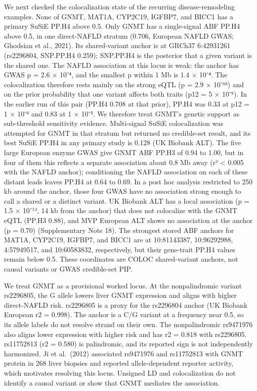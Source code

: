 We next checked the colocalization state of the recurring disease-remodeling examples. None of GNMT, MAT1A, CYP2C19, IGFBP7, and BICC1 has a primary SuSiE PP.H4 above 0.5. Only GNMT has a single-signal ABF PP.H4 above 0.5, in one direct-NAFLD stratum (0.706, European NAFLD GWAS; Ghodsian et al., 2021). Its shared-variant anchor is at GRCh37 6:42931261 (rs2296804, SNP.PP.H4 0.259); SNP.PP.H4 is the posterior that a given variant is the shared one. The NAFLD association at this locus is weak: the anchor has GWAS p = 2.6 × 10⁻⁴, and the smallest p within 1 Mb is 1.4 × 10⁻⁴. The colocalization therefore rests mainly on the strong eQTL (p = 2.9 × 10⁻⁶⁶) and on the prior probability that one variant affects both traits (p12 = 5 × 10⁻⁶). In the earlier run of this pair (PP.H4 0.708 at that prior), PP.H4 was 0.33 at p12 = 1 × 10⁻⁶ and 0.83 at 1 × 10⁻⁵. We therefore treat GNMT's genetic support as sub-threshold sensitivity evidence. Multi-signal SuSiE colocalization was attempted for GNMT in that stratum but returned no credible-set result, and its best SuSiE PP.H4 in any primary study is 0.128 (UK Biobank ALT). The five large European enzyme GWAS give GNMT ABF PP.H3 of 0.94 to 1.00, but in four of them this reflects a separate association about 0.8 Mb away (r² \textless{} 0.005 with the NAFLD anchor); conditioning the NAFLD association on each of these distant leads leaves PP.H4 at 0.64 to 0.69. In a post hoc analysis restricted to 250 kb around the anchor, those four GWAS have no association strong enough to call a shared or a distinct variant. UK Biobank ALT has a local association (p = 1.5 × 10⁻¹³, 14 kb from the anchor) that does not colocalize with the GNMT eQTL (PP.H3 0.88), and MVP European ALT shows no association at the anchor (p = 0.70) (Supplementary Note 18). The strongest stored ABF anchors for MAT1A, CYP2C19, IGFBP7, and BICC1 are at 10:81143387, 10:96292988, 4:57949517, and 10:60583832, respectively, but their gene-trait PP.H4 values remain below 0.5. These coordinates are COLOC shared-variant anchors, not causal variants or GWAS credible-set PIP.

We treat GNMT as a provisional worked locus. At the nonpalindromic variant rs2296805, the G allele lowers liver GNMT expression and aligns with higher direct-NAFLD risk. rs2296805 is a proxy for the rs2296804 anchor (UK Biobank European r2 = 0.998). The anchor is a C/G variant at a frequency near 0.5, so its allele labels do not resolve strand on their own. The nonpalindromic rs9471976 also aligns lower expression with higher risk and has r2 = 0.818 with rs2296805. rs11752813 (r2 = 0.580) is palindromic, and its reported sign is not independently harmonized. Ji et al.~(2012) associated rs9471976 and rs11752813 with GNMT protein in 268 liver biopsies and reported allele-dependent reporter activity, which motivates resolving this locus. Unsigned LD and colocalization do not identify a causal variant or show that GNMT mediates the association.

